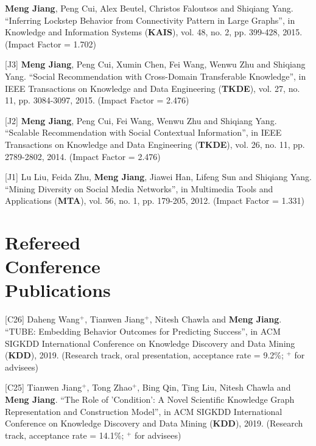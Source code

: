 \documentclass[margin, 9pt]{res}
\begin{document}
\begin{resume}
[J4] \textbf{Meng Jiang}, Peng Cui, Alex Beutel, Christos Faloutsos and Shiqiang Yang. ``Inferring Lockstep Behavior from Connectivity Pattern in Large Graphs'', in Knowledge and Information Systems (\textbf{KAIS}), vol. 48, no. 2, pp. 399-428, 2015. (Impact Factor = 1.702)

[J3] \textbf{Meng Jiang}, Peng Cui, Xumin Chen, Fei Wang, Wenwu Zhu and Shiqiang Yang. ``Social Recommendation with Cross-Domain Transferable Knowledge'', in IEEE Transactions on Knowledge and Data Engineering (\textbf{TKDE}), vol. 27, no. 11, pp. 3084-3097, 2015. (Impact Factor = 2.476)

[J2] \textbf{Meng Jiang}, Peng Cui, Fei Wang, Wenwu Zhu and Shiqiang Yang. ``Scalable Recommendation with Social Contextual Information'', in IEEE Transactions on Knowledge and Data Engineering (\textbf{TKDE}), vol. 26, no. 11, pp. 2789-2802, 2014. (Impact Factor = 2.476)

[J1] Lu Liu, Feida Zhu, \textbf{Meng Jiang}, Jiawei Han, Lifeng Sun and Shiqiang Yang. ``Mining Diversity on Social Media Networks'', in Multimedia Tools and Applications (\textbf{MTA}), vol. 56, no. 1, pp. 179-205, 2012. (Impact Factor = 1.331)


\section{Refereed \\ Conference \\ Publications}


[C26] Daheng Wang${}^{+}$, Tianwen Jiang${}^{+}$, Nitesh Chawla and \textbf{Meng Jiang}. ``TUBE: Embedding Behavior Outcomes for Predicting Success'', in ACM SIGKDD International Conference on Knowledge Discovery and Data Mining (\textbf{KDD}), 2019. (Research track, oral presentation, acceptance rate = 9.2\%; ${}^{+}$ for advisees)

[C25] Tianwen Jiang${}^{+}$, Tong Zhao${}^{+}$, Bing Qin, Ting Liu, Nitesh Chawla and \textbf{Meng Jiang}. ``The Role of 'Condition': A Novel Scientific Knowledge Graph Representation and Construction Model'', in ACM SIGKDD International Conference on Knowledge Discovery and Data Mining (\textbf{KDD}), 2019. (Research track, acceptance rate = 14.1\%; ${}^{+}$ for advisees)


\end{resume}
\end{document}

